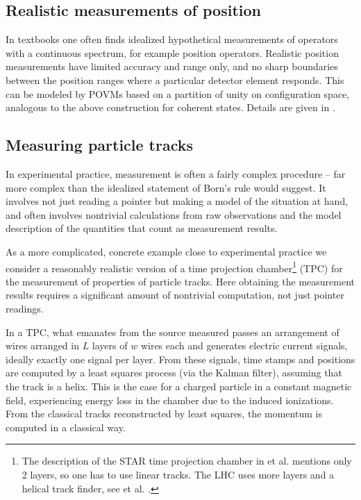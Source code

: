 \documentclass[12pt]{article}
\begin{document}
\subsection{Realistic measurements of position}

In textbooks one often finds idealized hypothetical measurements of
operators with a continuous spectrum, for example position operators.
Realistic position measurements have limited accuracy and range only,
and no sharp boundaries between the position ranges where a particular
detector element responds. This can be modeled by POVMs based on a
partition of unity on configuration space, analogous to the above 
construction for coherent states. Details are given in
 \cite{AliE.meas}.


\subsection{Measuring particle tracks}\label{ss.tracks}

In experimental practice, measurement is often a fairly complex
procedure -- far more complex than the idealized statement of Born's
rule would suggest.
It involves not just reading a pointer but making a model of
the situation at hand, and often involves nontrivial calculations from
raw observations and the model description of the quantities that count
as measurement results.

As a more complicated, concrete example close to experimental practice
we consider a reasonably realistic version of a time projection 
chamber\footnote{
The description of the STAR time projection chamber in
 et al. \cite[ Section 5.2]{And} mentions only 2 layers,
so one has to use linear tracks. The LHC uses more layers and a
helical track finder, see  et al. \cite[ Section 5]{Agg}.
} %
(TPC) for the measurement of properties of particle tracks. Here 
obtaining the measurement results requires a significant amount of 
nontrivial computation, not just pointer readings.

In a TPC, what emanates from the source measured passes an arrangement
of wires arranged in $L$ layers of $w$ wires each and generates electric
current signals, ideally exactly one signal per layer. From these
signals, time stamps and positions are computed by a least squares
process (via the Kalman filter), assuming that the track is a helix.
This is the case for a charged particle in a constant magnetic field,
experiencing energy loss in the chamber due to the induced ionizations.
From the classical tracks reconstructed by least squares, the momentum
is computed in a classical way.
\end{document}
